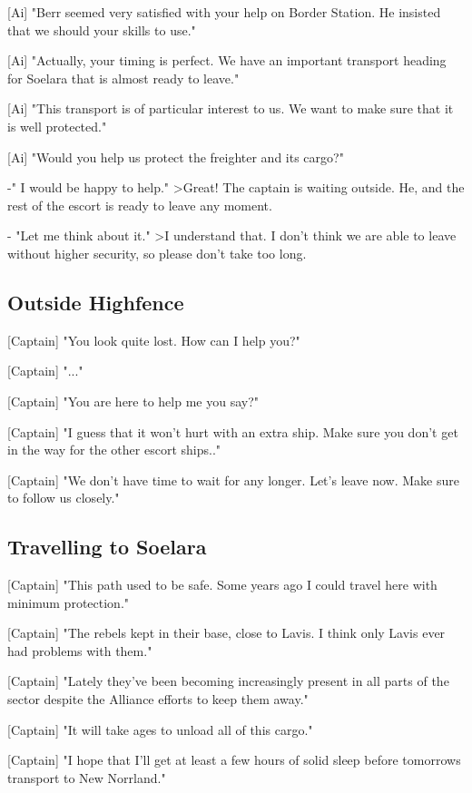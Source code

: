 \documentclass[a4paper,12pt]{article}
\begin{document}
[Ai] "Berr seemed very satisfied with your help on Border Station. He insisted
that we should your skills to use."

[Ai] "Actually, your timing is perfect. We have an important transport heading
for Soelara that is almost ready to leave."

[Ai] "This transport is of particular interest to us. We want to make sure that it is well protected."

[Ai] "Would you help us protect the freighter and its cargo?"

-" I would be happy to help."
\textgreater Great! The captain is waiting outside. He, and the rest of the escort
is ready to leave any moment.

- "Let me think about it."
\textgreater I understand that. I don't think we are able to leave without higher
security, so please don't take too long.

\subsection{Outside Highfence}

[Captain] "You look quite lost. How can I help you?"

[Captain] "..."

[Captain] "You are here to help me you say?" 

[Captain] "I guess that it won't hurt with an extra ship. Make sure you don't get in the way for the other
escort ships.."

[Captain] "We don't have time to wait for any longer. Let's leave now. Make sure to follow
us closely."

\subsection{Travelling to Soelara}

[Captain] "This path used to be safe. Some years ago I could travel here with minimum protection."

[Captain] "The rebels kept in their base, close to Lavis. I think only Lavis ever had problems with them."

[Captain] "Lately they've been becoming increasingly present in all parts of the sector
despite the Alliance efforts to keep them away."

[Captain] "It will take ages to unload all of this cargo." 

[Captain] "I hope that I'll get at least a few hours of solid sleep before tomorrows 
transport to New Norrland."
\end{document}
